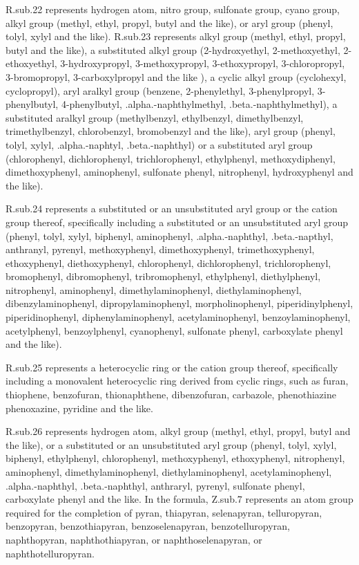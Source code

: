 \documentclass[11pt,a4paper]{article}
\begin{document}
R.sub.22 represents hydrogen atom, nitro group, sulfonate group, cyano group, alkyl group (methyl, ethyl, propyl, butyl and the like), or aryl group (phenyl, tolyl, xylyl and the like). R.sub.23 represents alkyl group (methyl, ethyl, propyl, butyl and the like), a substituted alkyl group (2-hydroxyethyl, 2-methoxyethyl, 2-ethoxyethyl, 3-hydroxypropyl, 3-methoxypropyl, 3-ethoxypropyl, 3-chloropropyl, 3-bromopropyl, 3-carboxylpropyl and the like ), a cyclic alkyl group (cyclohexyl, cyclopropyl), aryl aralkyl group (benzene, 2-phenylethyl, 3-phenylpropyl, 3-phenylbutyl, 4-phenylbutyl, .alpha.-naphthylmethyl, .beta.-naphthylmethyl), a substituted aralkyl group (methylbenzyl, ethylbenzyl, dimethylbenzyl, trimethylbenzyl, chlorobenzyl, bromobenzyl and the like), aryl group (phenyl, tolyl, xylyl, .alpha.-naphtyl, .beta.-naphthyl) or a substituted aryl group (chlorophenyl, dichlorophenyl, trichlorophenyl, ethylphenyl, methoxydiphenyl, dimethoxyphenyl, aminophenyl, sulfonate phenyl, nitrophenyl, hydroxyphenyl and the like).

R.sub.24 represents a substituted or an unsubstituted aryl group or the cation group thereof, specifically including a substituted or an unsubstituted aryl group (phenyl, tolyl, xylyl, biphenyl, aminophenyl, .alpha.-naphthyl, .beta.-napthyl, anthranyl, pyrenyl, methoxyphenyl, dimethoxyphenyl, trimethoxyphenyl, ethoxyphenyl, diethoxyphenyl, chlorophenyl, dichlorophenyl, trichlorophenyl, bromophenyl, dibromophenyl, tribromophenyl, ethylphenyl, diethylphenyl, nitrophenyl, aminophenyl, dimethylaminophenyl, diethylaminophenyl, dibenzylaminophenyl, dipropylaminophenyl, morpholinophenyl, piperidinylphenyl, piperidinophenyl, diphenylaminophenyl, acetylaminophenyl, benzoylaminophenyl, acetylphenyl, benzoylphenyl, cyanophenyl, sulfonate phenyl, carboxylate phenyl and the like).

R.sub.25 represents a heterocyclic ring or the cation group thereof, specifically including a monovalent heterocyclic ring derived from cyclic rings, such as furan, thiophene, benzofuran, thionaphthene, dibenzofuran, carbazole, phenothiazine phenoxazine, pyridine and the like.

R.sub.26 represents hydrogen atom, alkyl group (methyl, ethyl, propyl, butyl and the like), or a substituted or an unsubstituted aryl group (phenyl, tolyl, xylyl, biphenyl, ethylphenyl, chlorophenyl, methoxyphenyl, ethoxyphenyl, nitrophenyl, aminophenyl, dimethylaminophenyl, diethylaminophenyl, acetylaminophenyl, .alpha.-naphthyl, .beta.-naphthyl, anthraryl, pyrenyl, sulfonate phenyl, carboxylate phenyl and the like. In the formula, Z.sub.7 represents an atom group required for the completion of pyran, thiapyran, selenapyran, telluropyran, benzopyran, benzothiapyran, benzoselenapyran, benzotelluropyran, naphthopyran, naphthothiapyran, or naphthoselenapyran, or naphthotelluropyran.
\end{document}
